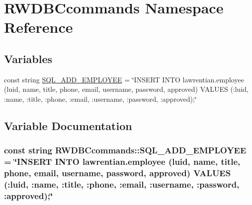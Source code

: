 \hypertarget{namespace_r_w_d_b_ccommands}{}\section{R\+W\+D\+B\+Ccommands Namespace Reference}
\label{namespace_r_w_d_b_ccommands}
\subsection*{Variables}
\begin{DoxyCompactItemize}
\item 
const string \hyperlink{namespace_r_w_d_b_ccommands_af6f01d3f5f088134ec84d397754d57e1}{S\+Q\+L\+\_\+\+A\+D\+D\+\_\+\+E\+M\+P\+L\+O\+Y\+E\+E} = \char`\"{}I\+N\+S\+E\+R\+T I\+N\+T\+O lawrentian.\+employee (luid, name, title, phone, email, username, password, approved) V\+A\+L\+U\+E\+S (\+:luid, \+:name, \+:title, \+:phone, \+:email, \+:username, \+:password, \+:approved);\char`\"{}
\end{DoxyCompactItemize}


\subsection{Variable Documentation}
\hypertarget{namespace_r_w_d_b_ccommands_af6f01d3f5f088134ec84d397754d57e1}{}
\subsubsection[{S\+Q\+L\+\_\+\+A\+D\+D\+\_\+\+E\+M\+P\+L\+O\+Y\+E\+E}]{\setlength{\rightskip}{0pt plus 5cm}const string R\+W\+D\+B\+Ccommands\+::\+S\+Q\+L\+\_\+\+A\+D\+D\+\_\+\+E\+M\+P\+L\+O\+Y\+E\+E = \char`\"{}I\+N\+S\+E\+R\+T I\+N\+T\+O lawrentian.\+employee (luid, name, title, phone, email, username, password, approved) V\+A\+L\+U\+E\+S (\+:luid, \+:name, \+:title, \+:phone, \+:email, \+:username, \+:password, \+:approved);\char`\"{}}\label{namespace_r_w_d_b_ccommands_af6f01d3f5f088134ec84d397754d57e1}
